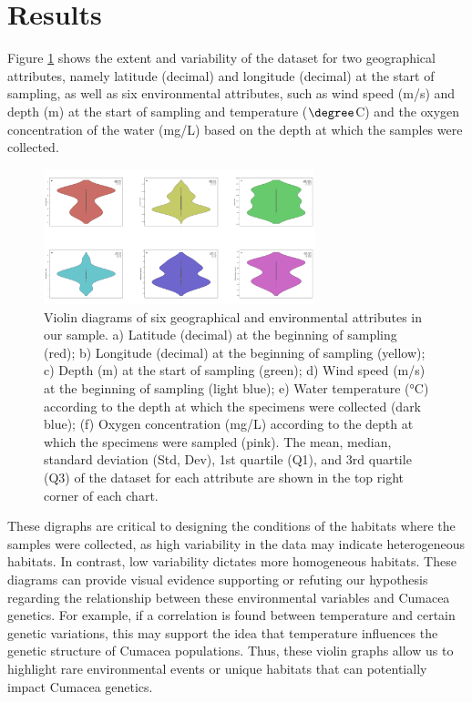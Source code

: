 \section{Results}\label{results}

Figure \ref{fig:fig1} shows the extent and variability of the dataset for two geographical attributes, namely latitude (decimal) and longitude (decimal) at the start of sampling, as well as six environmental attributes, such as wind speed (m/s) and depth (m) at the start of sampling and temperature ($\degree$C) and the oxygen concentration of the water (mg/L) based on the depth at which the samples were collected.

\begin{figure}[]
    \centering
    \includegraphics[width=0.7\textwidth]{figure1.jpg}
    \caption{Violin diagrams of six geographical and environmental attributes in our sample. a) Latitude (decimal) at the beginning of sampling (red); b) Longitude (decimal) at the beginning of sampling (yellow); c) Depth (m) at the start of sampling (green); d) Wind speed (m/s) at the beginning of sampling (light blue); e) Water temperature (°C) according to the depth at which the specimens were collected (dark blue); (f) Oxygen concentration (mg/L) according to the depth at which the specimens were sampled (pink). The mean, median, standard deviation (Std, Dev), 1st quartile (Q1), and 3rd quartile (Q3) of the dataset for each attribute are shown in the top right corner of each chart. \label{fig:fig1}}
\end{figure}

These digraphs are critical to designing the conditions of the habitats where the samples were collected, as high variability in the data may indicate heterogeneous habitats. In contrast, low variability dictates more homogeneous habitats. These diagrams can provide visual evidence supporting or refuting our hypothesis regarding the relationship between these environmental variables and Cumacea genetics. For example, if a correlation is found between temperature and certain genetic variations, this may support the idea that temperature influences the genetic structure of Cumacea populations. Thus, these violin graphs allow us to highlight rare environmental events or unique habitats that can potentially impact Cumacea genetics. 

